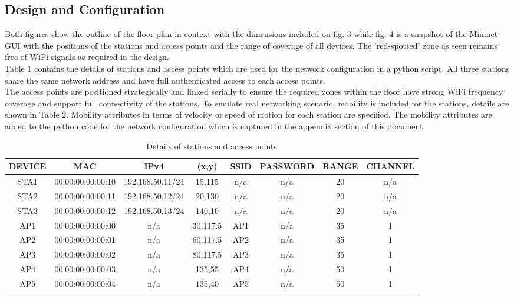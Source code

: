 \documentclass{article}
\begin{document}
\subsection{Design and Configuration}
Both figures show the outline of the floor-plan in context with the dimensions included on fig. 3 while fig. 4 is a snapshot of the Mininet GUI with the positions of the stations and access points and the range of coverage of all devices. The 'red-spotted' zone as seen remains free of WiFi signals as required in the design. \\ Table 1 contains the details of stations and access points which are used for the network configuration in a python script. All three stations share the same network address and have full authenticated access to each access points. \\ The access points are positioned strategically and linked serially to ensure the required zones within the floor have strong WiFi frequency coverage and support full connectivity of the stations. To emulate real networking scenario, mobility is included for the stations, details are shown in Table 2. Mobility attributes in terms of velocity or speed of motion for each station are specified. The mobility attributes are added to the python code for the network configuration which is captured in the appendix section of this document.
  	\begin{table}[h]
        		\centering
        		\begin{tabular}{|c|c|c|c|c|c|c|c|}
        			\hline
        			DEVICE & MAC & IPv4 & (x,y) & SSID & PASSWORD & RANGE & CHANNEL\\
        			\hline
        			STA1 & 00:00:00:00:00:10 & 192.168.50.11/24 & 15,115 & n/a & n/a & 20 & n/a \\
        			STA2 & 00:00:00:00:00:11 & 192.168.50.12/24 & 20,130 & n/a & n/a & 20 & n/a \\
       			STA3 & 00:00:00:00:00:12 & 192.168.50.13/24 & 140,10 & n/a & n/a & 20 & n/a \\
        			AP1 & 00:00:00:00:00:00 & n/a & 30,117.5 & AP1 & n/a & 35 & 1 \\
        			AP2 & 00:00:00:00:00:01 & n/a & 60,117.5 & AP2 & n/a & 35 & 1 \\
        			AP3 & 00:00:00:00:00:02 & n/a & 80,117.5 & AP3 & n/a & 35 & 1 \\
        			AP4 & 00:00:00:00:00:03 & n/a & 135,55 & AP4 & n/a & 50 & 1 \\
        			AP5 & 00:00:00:00:00:04 & n/a & 135,40 & AP5 & n/a & 50 & 1 \\
        			\hline
        		\end{tabular}
        \caption{Details of stations and access points}
        \label{tab:1}
    	\end{table}
\end{document}
